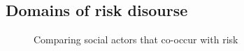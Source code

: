 
\subsection{Domains of risk disourse}

\begin{figure}[htb!]
\centering
{}
\caption{Comparing social actors that co-occur with risk}
\label{fig:comparison}
\end{figure}

